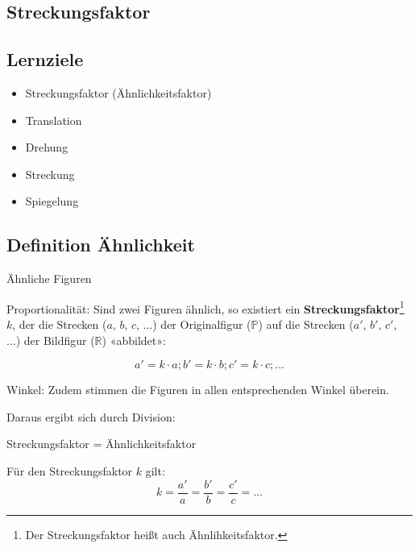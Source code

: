 
\subsection{Streckungsfaktor}

\subsection*{Lernziele}

\begin{itemize}
\item Streckungsfaktor (Ähnlichkeitsfaktor)
\item Translation
\item Drehung
\item Streckung
\item Spiegelung
\end{itemize}

\newpage


\subsection{Definition Ähnlichkeit}



\begin{definition}{Ähnliche Figuren}{}
  
Proportionalität: Sind zwei Figuren ähnlich, so existiert ein
\textbf{Streckungsfaktor}\footnote{Der
  Streckungsfaktor heißt auch Ähnlihkeitsfaktor.}
$k$, der die Strecken ($a$, $b$, $c$, ...) der Originalfigur
($\mathbb{P}$) auf die Strecken ($a'$, $b'$, $c'$, ...) der Bildfigur
($\mathbb{R}$) «abbildet»:

$$a' = k\cdot{}a; b' = k\cdot{}b; c' = k\cdot{} c; ...$$

Winkel: Zudem stimmen die Figuren in allen entsprechenden Winkel überein.
\end{definition}

Daraus ergibt sich durch Division:
\begin{gesetz}{Streckungsfaktor
    = Ähnlichkeitsfaktor}{}

  Für den Streckungsfaktor $k$ gilt:
  $$k = \frac{a'}{a} = \frac{b'}{b} = \frac{c'}{c} = ...$$
\end{gesetz}


